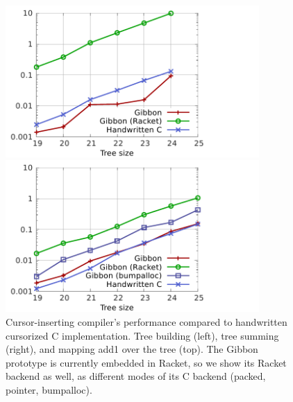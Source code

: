 \documentclass[a4paper,english]{lipics-v2016}
\begin{document}
\begin{figure}[t]
  \hspace{-6mm}  
\begin{minipage}{1.00\textwidth}
  \begin{minipage}{.49\textwidth}
    \centering
       \includegraphics[width=3.8in]{./figs/shootout_gibbon_buildtree.pdf}
  \end{minipage}
  \hspace{0.03\textwidth}
  \begin{minipage}{.49\textwidth}
    \centering
    \includegraphics[width=3.8in]{./figs/shootout_gibbon_sumtree2.pdf}
  \end{minipage}
\end{minipage}
   \caption{Cursor-inserting compiler's performance compared to handwritten
     cursorized C implementation.  Tree building (left), tree summing (right),
     and mapping add1 over the tree (top). The Gibbon prototype is currently
     embedded in Racket, so we show its Racket backend as well, as different
     modes of its C backend (packed, pointer, bumpalloc).}
   \label{fig:shootout2}
\end{figure}
\end{document}
